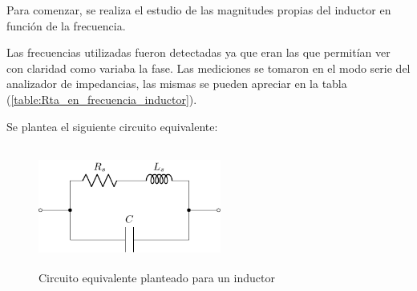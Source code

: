 Para comenzar, se realiza el estudio de las magnitudes propias del inductor en función de la frecuencia. \par Las frecuencias utilizadas fueron detectadas ya que eran las que permitían ver con claridad como variaba la fase. Las mediciones se tomaron en el modo serie del analizador de impedancias, las mismas se pueden apreciar en la tabla (\ref{table:Rta_en_frecuencia_inductor}).


Se plantea el siguiente circuito equivalente:

\begin{figure}[H]
\centering
\includegraphics[width=6cm,height=4cm]{Ejercicio_1(Germo)/Circuitos/circuito_equivalente_inductancia.pdf}
\caption{Circuito equivalente planteado para un inductor}
\label{fig:circuito_equivalente_inductancia}
\end{figure}

